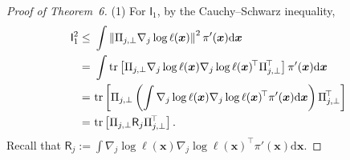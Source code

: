 \documentclass[10pt,a4paper]{amsart}
\newcommand{\Brac}[1]{\left(#1\right)}
\newcommand{\Rectbrac}[1]{\left[#1\right]}
\newcommand{\bx}{{\boldsymbol{x}}}
\newcommand{\matT}{^{\!\top}}
\newcommand{\mdd}{\mathrm{d}}
\newcommand{\norm}[1]{\left\|#1\right\|}
\newcommand{\sfI}{\mathsf{I}}
\newcommand{\sfR}{\mathsf{R}}
\newcommand{\tr}{\text{\rm tr}}
\begin{document}
\begin{proof}[Proof of Theorem~6]
\noindent
(1) For $\sfI_1$, by the Cauchy--Schwarz inequality,
\begin{equation}
\label{eqn:pf_LLIS_I1}
\begin{split}
    \sfI_1^2 \le~& \int \norm{ \Pi_{j,\bot} \nabla_j \log \ell (\bx) }^2 \pi'(\bx) \mdd \bx \\
    =~& \int \tr \Rectbrac{  \Pi_{j,\bot} \nabla_j \log \ell (\bx) \nabla_j \log \ell(\bx) \matT \Pi_{j,\bot}\matT } \pi'(\bx) \mdd \bx \\
    =~& \tr \Rectbrac{ \Pi_{j,\bot} \Brac{  \int \nabla_j \log \ell(\bx) \nabla_j \log \ell(\bx) \matT \pi'(\bx) \mdd \bx } \Pi_{j,\bot}\matT } \\
    =~& \tr \Rectbrac{ \Pi_{j,\bot} \sfR_j \Pi_{j,\bot}\matT }.
\end{split}
\end{equation}
Recall that $\sfR_j := \int \nabla_j \log \ell(\bx) \nabla_j \log \ell(\bx) \matT \pi'(\bx) \mdd \bx$.


\end{proof}
\end{document}
